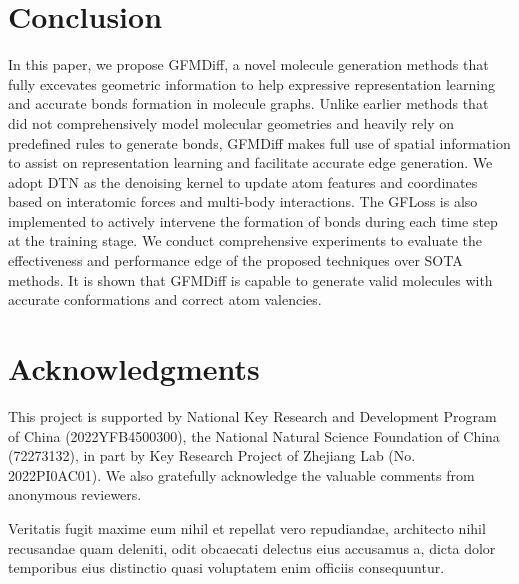 \documentclass[letterpaper]{article}
\begin{document}
\section{Conclusion}
In this paper, we propose GFMDiff, a novel molecule generation methods that fully excevates geometric information to help expressive representation learning and accurate bonds formation in molecule graphs. Unlike earlier methods that did not comprehensively model molecular geometries and heavily rely on predefined rules to generate bonds, GFMDiff makes full use of spatial information to assist on representation learning and facilitate accurate edge generation. We adopt DTN as the denoising kernel to update atom features and coordinates based on interatomic forces and multi-body interactions. The GFLoss is also implemented to actively intervene the formation of bonds during each time step at the training stage. We conduct comprehensive experiments to evaluate the effectiveness and performance edge of the proposed techniques over SOTA methods. It is shown that GFMDiff is capable to generate valid molecules with accurate conformations and correct atom valencies.


\section{Acknowledgments}
This project is supported by National Key Research and Development Program of China (2022YFB4500300), the National Natural Science Foundation of China (72273132), in part by Key Research Project of Zhejiang Lab (No. 2022PI0AC01). We also gratefully acknowledge the valuable comments from anonymous reviewers.


Veritatis fugit maxime eum nihil et repellat vero repudiandae, architecto nihil recusandae quam deleniti, odit obcaecati delectus eius accusamus a, dicta dolor temporibus eius distinctio quasi voluptatem enim officiis consequuntur.\clearpage

\end{document}
